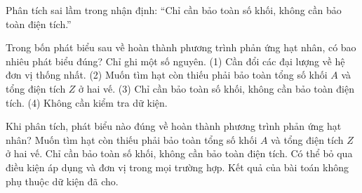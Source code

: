 \begin{bt}
Phân tích sai lầm trong nhận định: “Chỉ cần bảo toàn số khối, không cần bảo toàn điện tích.”
\end{bt}

\begin{ex}
Trong bốn phát biểu sau về hoàn thành phương trình phản ứng hạt nhân, có bao nhiêu phát biểu đúng? Chỉ ghi một số nguyên. (1) Cần đổi các đại lượng về hệ đơn vị thống nhất. (2) Muốn tìm hạt còn thiếu phải bảo toàn tổng số khối $A$ và tổng điện tích $Z$ ở hai vế. (3) Chỉ cần bảo toàn số khối, không cần bảo toàn điện tích. (4) Không cần kiểm tra dữ kiện.
\end{ex}

\begin{ex}
Khi phân tích, phát biểu nào đúng về hoàn thành phương trình phản ứng hạt nhân?
\choice
{\True Muốn tìm hạt còn thiếu phải bảo toàn tổng số khối $A$ và tổng điện tích $Z$ ở hai vế.}
{Chỉ cần bảo toàn số khối, không cần bảo toàn điện tích.}
{Có thể bỏ qua điều kiện áp dụng và đơn vị trong mọi trường hợp.}
{Kết quả của bài toán không phụ thuộc dữ kiện đã cho.}
\end{ex}

